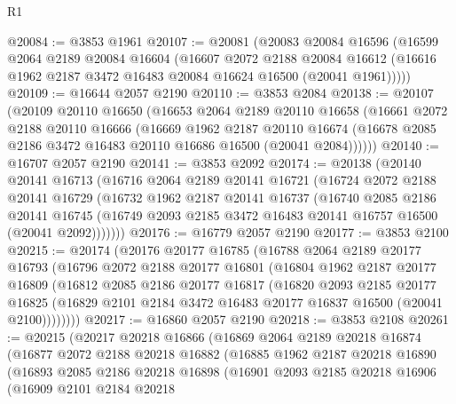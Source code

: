 \begin{lexlean}{R1}
\begin{coremodule}
@20084 := @3853 @1961
@20107 := @20081
    (@20083
      @20084
      @16596
      (@16599
        @2064
        @2189
        @20084
        @16604
        (@16607
          @2072
          @2188
          @20084
          @16612
          (@16616 @1962 @2187 @3472 @16483 @20084 @16624 @16500 (@20041 @1961)))))
@20109 := @16644 @2057 @2190
@20110 := @3853 @2084
@20138 := @20107
    (@20109
      @20110
      @16650
      (@16653
        @2064
        @2189
        @20110
        @16658
        (@16661
          @2072
          @2188
          @20110
          @16666
          (@16669
            @1962
            @2187
            @20110
            @16674
            (@16678 @2085 @2186 @3472 @16483 @20110 @16686 @16500 (@20041 @2084))))))
@20140 := @16707 @2057 @2190
@20141 := @3853 @2092
@20174 := @20138
    (@20140
      @20141
      @16713
      (@16716
        @2064
        @2189
        @20141
        @16721
        (@16724
          @2072
          @2188
          @20141
          @16729
          (@16732
            @1962
            @2187
            @20141
            @16737
            (@16740
              @2085
              @2186
              @20141
              @16745
              (@16749 @2093 @2185 @3472 @16483 @20141 @16757 @16500 (@20041 @2092)))))))
@20176 := @16779 @2057 @2190
@20177 := @3853 @2100
@20215 := @20174
    (@20176
      @20177
      @16785
      (@16788
        @2064
        @2189
        @20177
        @16793
        (@16796
          @2072
          @2188
          @20177
          @16801
          (@16804
            @1962
            @2187
            @20177
            @16809
            (@16812
              @2085
              @2186
              @20177
              @16817
              (@16820
                @2093
                @2185
                @20177
                @16825
                (@16829 @2101 @2184 @3472 @16483 @20177 @16837 @16500 (@20041 @2100))))))))
@20217 := @16860 @2057 @2190
@20218 := @3853 @2108
@20261 := @20215
    (@20217
      @20218
      @16866
      (@16869
        @2064
        @2189
        @20218
        @16874
        (@16877
          @2072
          @2188
          @20218
          @16882
          (@16885
            @1962
            @2187
            @20218
            @16890
            (@16893
              @2085
              @2186
              @20218
              @16898
              (@16901
                @2093
                @2185
                @20218
                @16906
                (@16909
                  @2101
                  @2184
                  @20218

\end{coremodule}
\end{lexlean}
